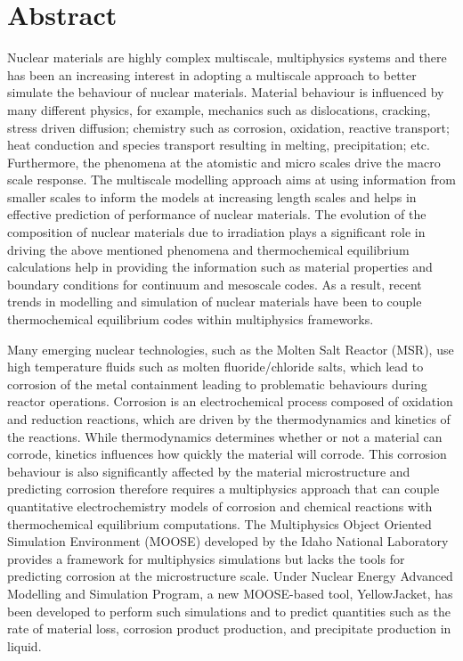 \chapter*{Abstract}


Nuclear materials are highly complex multiscale, multiphysics systems and there has been an increasing interest in adopting a multiscale approach to better simulate the behaviour of nuclear materials. Material behaviour is influenced by many different physics, for example, mechanics such as dislocations, cracking, stress driven diffusion; chemistry such as corrosion, oxidation, reactive transport; heat conduction and species transport resulting in melting, precipitation; etc. Furthermore, the phenomena at the atomistic and micro scales drive the macro scale response. The multiscale modelling approach aims at using information from smaller scales to inform the models at increasing length scales and helps in effective prediction of performance of nuclear materials. The evolution of the composition of nuclear materials due to irradiation plays a significant role in driving the above mentioned phenomena and thermochemical equilibrium calculations help in providing the information such as material properties and boundary conditions for continuum and mesoscale codes. As a result, recent trends in modelling and simulation of nuclear materials have been to couple thermochemical equilibrium codes within multiphysics frameworks.

Many emerging nuclear technologies, such as the Molten Salt Reactor (MSR), use high temperature fluids such as molten fluoride/chloride salts, which lead to corrosion of the metal containment leading to problematic behaviours during reactor operations. Corrosion is an electrochemical process composed of oxidation and reduction reactions, which are driven by the thermodynamics and kinetics of the reactions. While thermodynamics determines whether or not a material can corrode, kinetics influences how quickly the material will corrode. This corrosion behaviour is also significantly affected by the material microstructure and predicting corrosion therefore requires a multiphysics approach that can couple quantitative electrochemistry models of corrosion and chemical reactions with thermochemical equilibrium computations. The Multiphysics Object Oriented Simulation Environment 
(MOOSE) developed by the Idaho National Laboratory provides a framework for multiphysics simulations but lacks the tools for predicting corrosion at the microstructure scale. Under Nuclear Energy Advanced Modelling and Simulation Program, a new MOOSE-based tool, YellowJacket, has been developed to perform such simulations and to predict quantities such as the rate of material loss, corrosion product production, and precipitate production in liquid.

